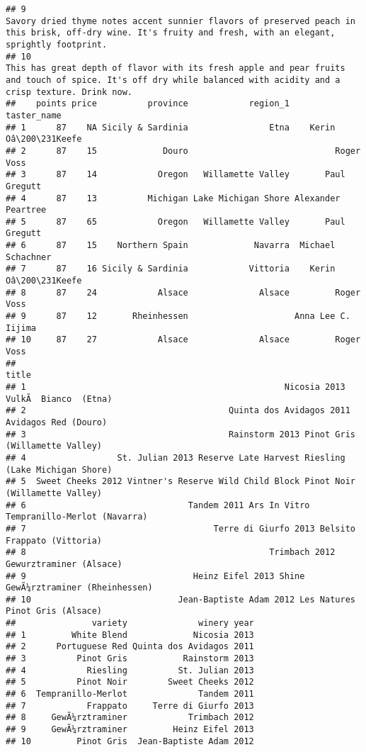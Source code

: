 \documentclass[
]{article}
\begin{document}
\begin{verbatim}
## 9                                                                                                           Savory dried thyme notes accent sunnier flavors of preserved peach in this brisk, off-dry wine. It's fruity and fresh, with an elegant, sprightly footprint.
## 10                                                                                                      This has great depth of flavor with its fresh apple and pear fruits and touch of spice. It's off dry while balanced with acidity and a crisp texture. Drink now.
##    points price          province            region_1        taster_name
## 1      87    NA Sicily & Sardinia                Etna    Kerin Oâ\200\231Keefe
## 2      87    15             Douro                             Roger Voss
## 3      87    14            Oregon   Willamette Valley       Paul Gregutt
## 4      87    13          Michigan Lake Michigan Shore Alexander Peartree
## 5      87    65            Oregon   Willamette Valley       Paul Gregutt
## 6      87    15    Northern Spain             Navarra  Michael Schachner
## 7      87    16 Sicily & Sardinia            Vittoria    Kerin Oâ\200\231Keefe
## 8      87    24            Alsace              Alsace         Roger Voss
## 9      87    12       Rheinhessen                     Anna Lee C. Iijima
## 10     87    27            Alsace              Alsace         Roger Voss
##                                                                                  title
## 1                                                   Nicosia 2013 VulkÃ  Bianco  (Etna)
## 2                                        Quinta dos Avidagos 2011 Avidagos Red (Douro)
## 3                                        Rainstorm 2013 Pinot Gris (Willamette Valley)
## 4                  St. Julian 2013 Reserve Late Harvest Riesling (Lake Michigan Shore)
## 5  Sweet Cheeks 2012 Vintner's Reserve Wild Child Block Pinot Noir (Willamette Valley)
## 6                                Tandem 2011 Ars In Vitro Tempranillo-Merlot (Navarra)
## 7                                     Terre di Giurfo 2013 Belsito Frappato (Vittoria)
## 8                                                Trimbach 2012 Gewurztraminer (Alsace)
## 9                                 Heinz Eifel 2013 Shine GewÃ¼rztraminer (Rheinhessen)
## 10                             Jean-Baptiste Adam 2012 Les Natures Pinot Gris (Alsace)
##               variety              winery year
## 1         White Blend             Nicosia 2013
## 2      Portuguese Red Quinta dos Avidagos 2011
## 3          Pinot Gris           Rainstorm 2013
## 4            Riesling          St. Julian 2013
## 5          Pinot Noir        Sweet Cheeks 2012
## 6  Tempranillo-Merlot              Tandem 2011
## 7            Frappato     Terre di Giurfo 2013
## 8     GewÃ¼rztraminer            Trimbach 2012
## 9     GewÃ¼rztraminer         Heinz Eifel 2013
## 10         Pinot Gris  Jean-Baptiste Adam 2012
\end{verbatim}
\end{document}
